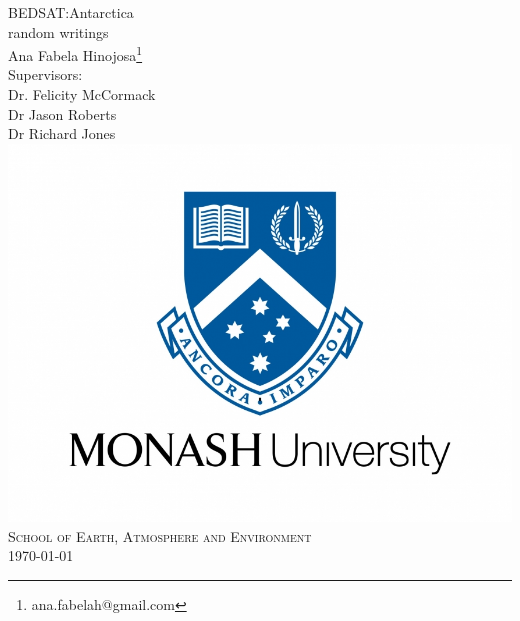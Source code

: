 \documentclass[12pt, a4paper, openany]{book}
\begin{document}
\begin{titlepage}
\begin{center}
    {\Huge BEDSAT:Antarctica}\\ [1cm] 
    {\Large random writings}\\ [2cm]
    {\large Ana Fabela Hinojosa\footnote{ana.fabelah@gmail.com}}\\ [1cm]
    Supervisors:\\
    Dr. Felicity McCormack\\
    Dr Jason Roberts\\
    Dr Richard Jones\\ [2cm]


    \includegraphics[scale=0.3]{logo.jpg}\\ [-0.7cm]
    \textsc{School of Earth, Atmosphere and Environment}\\ [1cm]
    \monthyeardate\today
\end{center}
\end{titlepage}



\end{document}

